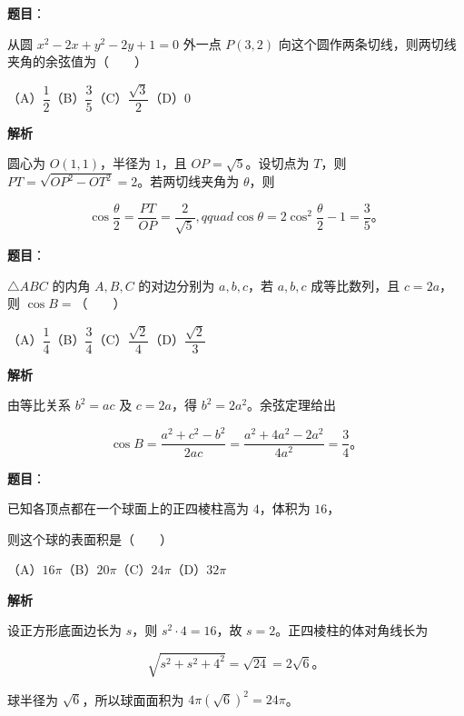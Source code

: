 \begin{answer}

\textbf{题目}：

从圆 $x^2-2x+y^2-2y+1=0$ 外一点 $P(3,2)$ 向这个圆作两条切线，则两切线夹角的余弦值为\mbox{（　　）}

（A）$\dfrac12$\quad（B）$\dfrac35$\quad（C）$\dfrac{\sqrt3}2$\quad（D）$0$

\textbf{解析}

圆心为 $O(1,1)$，半径为 $1$，且 $OP=\sqrt5$。设切点为 $T$，则 $PT=\sqrt{OP^2-OT^2}=2$。若两切线夹角为 $\theta$，则

\nopagebreak[4]
\[
\cos\frac\theta2=\frac{PT}{OP}=\frac2{\sqrt5},qquad
\cos\theta=2\cos^2\frac\theta2-1=\frac35\text{。}
\]


\end{answer}
\begin{answer}

\textbf{题目}：

$\triangle ABC$ 的内角 $A,B,C$ 的对边分别为 $a,b,c$，若 $a,b,c$ 成等比数列，且 $c=2a$，则 $\cos B=$\mbox{（　　）}

（A）$\dfrac14$\quad（B）$\dfrac34$\quad（C）$\dfrac{\sqrt2}4$\quad（D）$\dfrac{\sqrt2}3$

\textbf{解析}

由等比关系 $b^2=ac$ 及 $c=2a$，得 $b^2=2a^2$。余弦定理给出

\nopagebreak[4]
\[
\cos B=\frac{a^2+c^2-b^2}{2ac}
=\frac{a^2+4a^2-2a^2}{4a^2}=\frac34\text{。}
\]


\end{answer}
\begin{answer}

\textbf{题目}：

已知各顶点都在一个球面上的正四棱柱高为 $4$，体积为 $16$，

则这个球的表面积是\mbox{（　　）}

（A）$16\pi$\quad（B）$20\pi$\quad（C）$24\pi$\quad（D）$32\pi$

\textbf{解析}

设正方形底面边长为 $s$，则 $s^2\cdot4=16$，故 $s=2$。正四棱柱的体对角线长为

\nopagebreak[4]
\[
\sqrt{s^2+s^2+4^2}=\sqrt{24}=2\sqrt6\text{。}
\]

球半径为 $\sqrt6$，所以球面面积为 $4\pi(\sqrt6)^2=24\pi$。


\end{answer}
